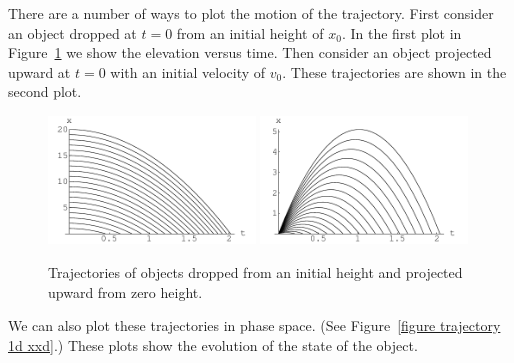 There are a number of ways to plot the motion of the trajectory.  First 
consider an object dropped at $t = 0$ from an initial height of $x_0$.
In the first plot in Figure~\ref{figure trajectory 1d tx} we show the 
elevation versus time.  Then consider an object projected upward at $t = 0$
with an initial velocity of $v_0$.  These trajectories are shown in the
second plot.

\begin{figure}[tb!]
  \begin{center}
    \includegraphics[width=0.49\textwidth]{ode/introduction/trajectory_1d_tx_x0}
    \includegraphics[width=0.49\textwidth]{ode/introduction/trajectory_1d_tx_v0}
  \end{center}
  \caption{Trajectories of objects dropped from an initial height and 
    projected upward from zero height.}
  \label{figure trajectory 1d tx}
\end{figure}

We can also plot these trajectories in phase space.  (See 
Figure~\ref{figure trajectory 1d xxd}.)  These plots show the evolution of the 
state of the object.

